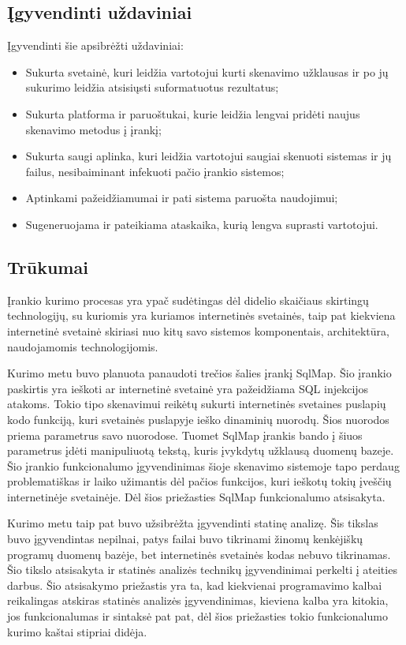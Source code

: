 \documentclass[a4paper,12pt,fleqn]{article}
\begin{document}
\subsection{Įgyvendinti uždaviniai}
\label{sec:example}
Įgyvendinti šie apsibrėžti uždaviniai: 
\begin{itemize}
	\item Sukurta svetainė, kuri leidžia vartotojui kurti skenavimo užklausas ir po jų sukurimo leidžia atsisiųsti suformatuotus rezultatus;
	\item Sukurta platforma ir paruoštukai, kurie leidžia lengvai pridėti naujus skenavimo metodus į įrankį;
	\item Sukurta saugi aplinka, kuri leidžia vartotojui saugiai skenuoti sistemas ir jų failus, nesibaiminant infekuoti pačio įrankio sistemos;
	\item Aptinkami pažeidžiamumai ir pati sistema paruošta naudojimui;
	\item Sugeneruojama ir pateikiama ataskaika, kurią lengva suprasti vartotojui.
\end{itemize}


\subsection{Trūkumai}
\label{sec:example}

Įrankio kurimo procesas yra ypač sudėtingas dėl didelio skaičiaus skirtingų technologijų, su kuriomis yra kuriamos internetinės svetainės, taip pat kiekviena internetinė svetainė skiriasi nuo kitų savo sistemos komponentais, architektūra, naudojamomis technologijomis.

Kurimo metu buvo planuota panaudoti trečios šalies įrankį SqlMap. Šio įrankio paskirtis yra ieškoti ar internetinė svetainė yra pažeidžiama SQL injekcijos atakoms. Tokio tipo skenavimui reikėtų sukurti internetinės svetaines puslapių kodo funkciją, kuri svetainės puslapyje ieško dinaminių nuorodų. Šios nuorodos priema parametrus savo nuorodose. Tuomet SqlMap įrankis bando į šiuos parametrus įdėti manipuliuotą tekstą, kuris įvykdytų užklausą duomenų bazeje. Šio įrankio funkcionalumo įgyvendinimas šioje skenavimo sistemoje tapo perdaug problematiškas ir laiko užimantis dėl pačios funkcijos, kuri ieškotų tokių įveščių internetinėje svetainėje. Dėl šios priežasties SqlMap funkcionalumo atsisakyta.

Kurimo metu taip pat buvo užsibrėžta įgyvendinti statinę analizę. Šis tikslas buvo įgyvendintas nepilnai, patys failai buvo tikrinami žinomų kenkėjiškų programų duomenų bazėje, bet internetinės svetainės kodas nebuvo tikrinamas. Šio tikslo atsisakyta ir statinės analizės technikų įgyvendinimai perkelti į ateities darbus. Šio atsisakymo priežastis yra ta, kad kiekvienai programavimo kalbai reikalingas atskiras statinės analizės įgyvendinimas, kieviena kalba yra kitokia, jos funkcionalumas ir sintaksė pat pat, dėl šios priežasties tokio funkcionalumo kurimo kaštai stipriai didėja.
\end{document}
